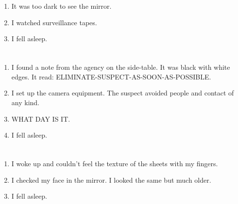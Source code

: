 \documentclass{article}
\begin{document}
    \newpage
    
    \section{}
    
    \begin{enumerate}
    
    \item It was too dark to see the mirror.\\
    
    \item I watched surveillance tapes.\\
    
    \item I fell asleep.\\
    
    \end{enumerate}
     
    \newpage
    
    \section{}
    
    \begin{enumerate}
    
    \item I found a note from the agency on the side-table. It was black with white edges. It read: ELIMINATE-SUSPECT-AS-SOON-AS-POSSIBLE.\\
    
    \item I set up the camera equipment. The suspect avoided people and contact of any kind.\\
    
    \item WHAT DAY IS IT.\\
    
    \item I fell asleep.\\
    
    \end{enumerate}
     
    \newpage
    
    \section{}
    
    \begin{enumerate}
    
    \item I woke up and couldn't feel the texture of the sheets with my fingers.\\
    
    \item I checked my face in the mirror. I looked the same but much older.\\
    
    \item I fell asleep.\\
    
    \end{enumerate}
     
\end{document}
